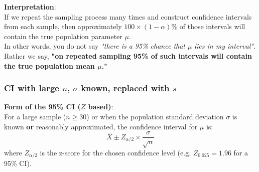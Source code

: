 \documentclass[9pt]{extarticle}
\begin{document}
\noindent\textbf{Interpretation}: \\
If we repeat the sampling process many times and construct confidence intervals from each sample, then approximately $100 \times (1 - \alpha)\%$ of those intervals will contain the true population parameter $\mu$.\\
In other words, you do not say \emph{"there is a 95\% chance that $\mu$ lies in my interval"}. Rather we say, \textbf{"on repeated sampling 95\% of such intervals will contain the true population mean $\mu$."} 

\subsubsection{CI with large $n$, $\sigma$ known, replaced with $s$}
\textbf{Form of the 95\% CI ($Z$ based)}: \\
For a large sample ($n \geq 30$) or when the population standard deviation $\sigma$ is known \textbf{or} reasonably approximated, the confidence interval for $\mu$ is:
$$\bar{X} \pm Z_{\alpha/2} \times \frac{\sigma}{\sqrt{n}}$$
where $Z_{\alpha/2}$ is the z-score for the chosen confidence level (e.g. $Z_{0.025} = 1.96$ for a 95\% CI).
\end{document}
